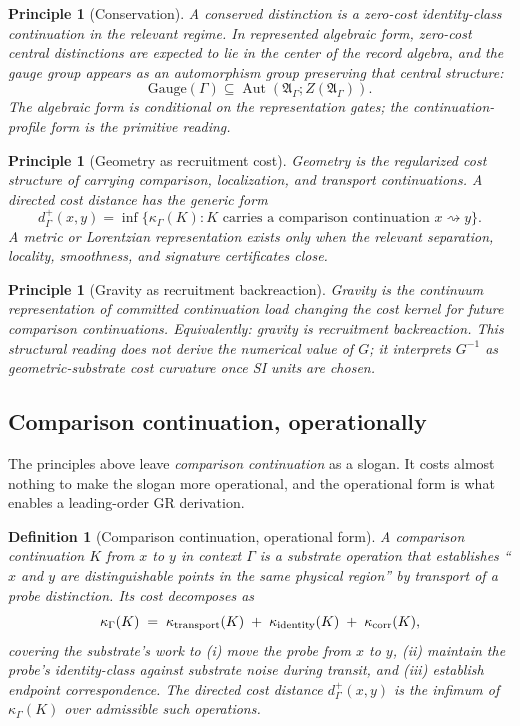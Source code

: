 \documentclass[11pt]{article}
\newtheorem{definition}[theorem]{Definition}
\newtheorem{principle}[theorem]{Principle}
\theoremstyle{remark}
\newcommand{\G}{\Gamma}
\newcommand{\goes}{\rightsquigarrow}
\newcommand{\Cost}{\kappa}
\newcommand{\Alg}{\mathfrak A}
\newcommand{\Aut}{\operatorname{Aut}}
\begin{document}
\begin{principle}[Conservation]
A conserved distinction is a zero-cost identity-class continuation in the relevant regime.  In represented algebraic form, zero-cost central distinctions are expected to lie in the center of the record algebra, and the gauge group appears as an automorphism group preserving that central structure:
\[
        \mathrm{Gauge}(\G)\subseteq \Aut(\Alg_\G;Z(\Alg_\G)).
\]
The algebraic form is conditional on the representation gates; the continuation-profile form is the primitive reading.
\end{principle}

\begin{principle}[Geometry as recruitment cost]
Geometry is the regularized cost structure of carrying comparison, localization, and transport continuations.  A directed cost distance has the generic form
\[
        d^+_\G(x,y)=\inf\{\Cost_\G(K):K\text{ carries a comparison continuation }x\goes y\}.
\]
A metric or Lorentzian representation exists only when the relevant separation, locality, smoothness, and signature certificates close.
\end{principle}

\begin{principle}[Gravity as recruitment backreaction]
Gravity is the continuum representation of committed continuation load changing the cost kernel for future comparison continuations.  Equivalently: gravity is recruitment backreaction.  This structural reading does not derive the numerical value of \(G\); it interprets \(G^{-1}\) as geometric-substrate cost curvature once SI units are chosen.
\end{principle}

\subsection{Comparison continuation, operationally}

The principles above leave \emph{comparison continuation} as a slogan.  It costs almost nothing to make the slogan more operational, and the operational form is what enables a leading-order GR derivation.

\begin{definition}[Comparison continuation, operational form]
A comparison continuation $K$ from $x$ to $y$ in context $\G$ is a substrate operation that establishes ``$x$ and $y$ are distinguishable points in the same physical region'' by transport of a probe distinction.  Its cost decomposes as
\[
        \Cost_\G(K) \;=\; \Cost_{\rm transport}(K) \;+\; \Cost_{\rm identity}(K) \;+\; \Cost_{\rm corr}(K),
\]
covering the substrate's work to (i) move the probe from $x$ to $y$, (ii) maintain the probe's identity-class against substrate noise during transit, and (iii) establish endpoint correspondence.  The directed cost distance $d^+_\G(x,y)$ is the infimum of $\Cost_\G(K)$ over admissible such operations.
\end{definition}
\end{document}
